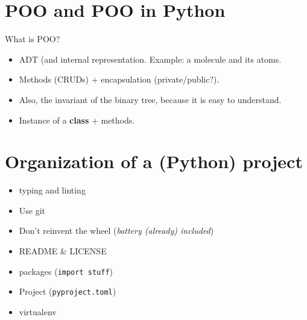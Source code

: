 \documentclass[10pt,
aspectratio=169
]{beamer}
\begin{document}
 \section{POO and POO in Python}
 
 \begin{frame}{What is POO?}
 	\begin{itemize}
 		\item ADT (and internal representation. Example: a molecule and its atoms.
 		\item Methods (CRUDs)  + encapsulation (private/public?).
 		\item Also, the invariant of the binary tree, because it is easy to understand.
 		\item Instance of a \textbf{class} + methods.
 	\end{itemize}
 \end{frame}
 
 \section{Organization of a (Python) project}
 
 \begin{frame}
 	\begin{itemize}
 		\item typing and linting
 		\item Use git
 		\item Don't reinvent the wheel (\textit{battery (already) included})
 		\item README \& LICENSE
 		\item packages (\texttt{import stuff})
 		\item Project (\texttt{pyproject.toml})
 		\item virtualenv
 	\end{itemize}
 \end{frame}
\end{document}
